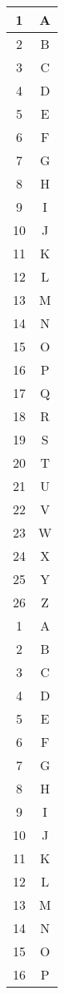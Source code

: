 \begin{center}
\centering
	\begin{longtable}{|c|c|}
	\hline
	1 & A \\
	\hline
	2 & B \\
	\hline
	3 & C \\
	\hline
	4 & D \\
	\hline
	5 & E \\
	\hline
	6 & F \\
	\hline
	7 & G \\
	\hline
	8 & H \\
	\hline
	9 & I \\
	\hline
	10 & J \\
	\hline
	11 & K \\
	\hline
	12 & L \\
	\hline
	13 & M \\
	\hline
	14 & N \\
	\hline
	15 & O \\
	\hline
	16 & P \\
	\hline
	17 & Q \\
	\hline
	18 & R \\
	\hline
	19 & S \\
	\hline
	20 & T \\
	\hline
	21 & U \\
	\hline
	22 & V \\
	\hline
	23 & W \\
	\hline
	24 & X \\
	\hline
	25 & Y \\
	\hline
	26 & Z \\
	\hline
	1 & A \\
	\hline
	2 & B \\
	\hline
	3 & C \\
	\hline
	4 & D \\
	\hline
	5 & E \\
	\hline
	6 & F \\
	\hline
	7 & G \\
	\hline
	8 & H \\
	\hline
	9 & I \\
	\hline
	10 & J \\
	\hline
	11 & K \\
	\hline
	12 & L \\
	\hline
	13 & M \\
	\hline
	14 & N \\
	\hline
	15 & O \\
	\hline
	16 & P \\
	\hline

\end{longtable}
\end{center}
